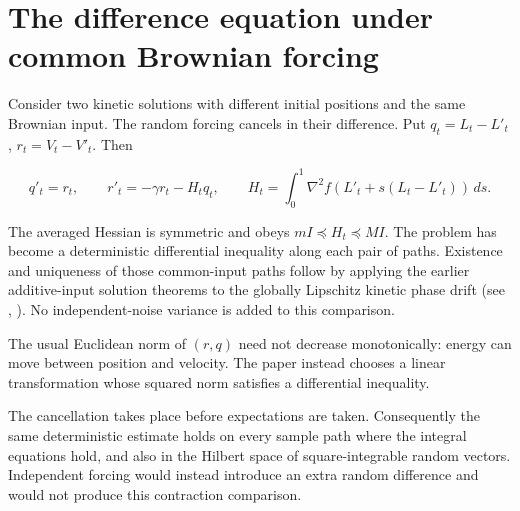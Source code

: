\documentclass[11pt,a4paper]{article}
\begin{document}
\section{\texorpdfstring{The difference equation under common Brownian forcing}{The difference equation under common Brownian forcing}}


Consider two kinetic solutions with different initial positions and the same Brownian input. The random forcing cancels in their difference. Put
\(q_t=L_t-L'_t\), \(r_t=V_t-V'_t\). Then


\[q'_t=r_t,\qquad r'_t=-\gamma r_t-H_tq_t,\qquad
H_t=\int_0^1\nabla^2f(L'_t+s(L_t-L'_t))\,ds.\]


The averaged Hessian is symmetric and obeys \(mI\preceq H_t\preceq MI\).
The problem has become a deterministic differential inequality along each pair
of paths. Existence and uniqueness of those common-input paths follow by applying the earlier additive-input solution theorems to the globally Lipschitz kinetic phase drift (see \cite[Section~3.14.3]{LangevinLean2026ULASC}, \cite[Section~3.43.2]{LangevinLean2026ULASC}). No independent-noise variance is added to this comparison.




The usual Euclidean norm of \((r,q)\) need not decrease monotonically:
energy can move between position and velocity. The paper instead chooses a
linear transformation whose squared norm satisfies a differential inequality.



The cancellation takes place before expectations are taken. Consequently the same deterministic estimate holds on every sample path where the integral equations hold, and also in the Hilbert space of square-integrable random vectors. Independent forcing would instead introduce an extra random difference and would not produce this contraction comparison.
\end{document}
